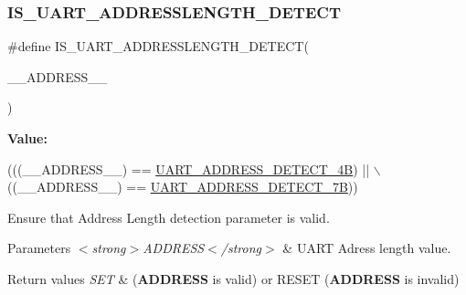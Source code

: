 \subsubsection{\texorpdfstring{I\+S\+\_\+\+U\+A\+R\+T\+\_\+\+A\+D\+D\+R\+E\+S\+S\+L\+E\+N\+G\+T\+H\+\_\+\+D\+E\+T\+E\+CT}{IS\_UART\_ADDRESSLENGTH\_DETECT}}
{\footnotesize\ttfamily \#define I\+S\+\_\+\+U\+A\+R\+T\+\_\+\+A\+D\+D\+R\+E\+S\+S\+L\+E\+N\+G\+T\+H\+\_\+\+D\+E\+T\+E\+CT(\begin{DoxyParamCaption}\item[{}]{\+\_\+\+\_\+\+A\+D\+D\+R\+E\+S\+S\+\_\+\+\_\+ }\end{DoxyParamCaption})}

{\bfseries Value\+:}
\begin{DoxyCode}
(((\_\_ADDRESS\_\_) == \hyperlink{group___u_a_r_t___wake_up___address___length_ga6599292020c484faeea894307d9dc6d5}{UART\_ADDRESS\_DETECT\_4B}) || \(\backslash\)
                                                   ((\_\_ADDRESS\_\_) == 
      \hyperlink{group___u_a_r_t___wake_up___address___length_ga4dbd5995e0e4998cb1a312c183d7cbb0}{UART\_ADDRESS\_DETECT\_7B}))
\end{DoxyCode}


Ensure that Address Length detection parameter is valid. 


\begin{DoxyParams}{Parameters}
{\em $<$strong$>$\+A\+D\+D\+R\+E\+S\+S$<$/strong$>$} & U\+A\+RT Adress length value. \\
\hline
\end{DoxyParams}

\begin{DoxyRetVals}{Return values}
{\em S\+ET} & ({\bfseries A\+D\+D\+R\+E\+SS} is valid) or R\+E\+S\+ET ({\bfseries A\+D\+D\+R\+E\+SS} is invalid) \\
\hline
\end{DoxyRetVals}
\mbox{\label{group___u_a_r_t___private___macros_ga7318c3e5c175b896444697a0a9407b2f}} 
